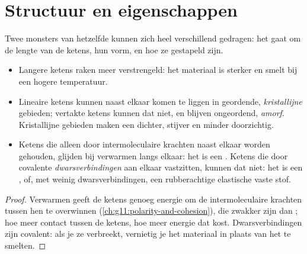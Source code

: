 \section{Structuur en eigenschappen}

Twee monsters van hetzelfde  kunnen zich heel verschillend
gedragen: het gaat om de lengte van de ketens, hun vorm, en hoe ze
gestapeld zijn.

\begin{proposition}\label{prop:g12:polymers:properties}
\begin{itemize}
  \item Langere ketens raken meer verstrengeld: het materiaal is sterker
        en smelt bij een hogere temperatuur.
  \item Lineaire ketens kunnen naast elkaar komen te liggen in geordende,
        \emph{kristallijne} gebieden; vertakte ketens kunnen dat niet, en
        blijven ongeordend, \emph{amorf}. Kristallijne gebieden maken een
         dichter, stijver en minder doorzichtig.
  \item Ketens die alleen door intermoleculaire krachten naast elkaar
        worden gehouden, glijden bij verwarmen langs elkaar: het 
        is een . Ketens die door covalente
        \emph{dwarsverbindingen} aan elkaar vastzitten, kunnen dat niet:
        het  is een , of, met weinig
        dwarsverbindingen, een rubberachtige elastische vaste stof.
\end{itemize}
\end{proposition}

\begin{proof}
Verwarmen geeft de ketens genoeg energie om de intermoleculaire krachten
tussen hen te overwinnen (\cref{ch:g11:polarity-and-cohesion}), die
zwakker zijn dan ; hoe meer contact tussen de ketens,
hoe meer energie dat kost. Dwarsverbindingen zijn covalent: als je ze
verbreekt, vernietig je het materiaal in plaats van het te smelten.
\end{proof}

